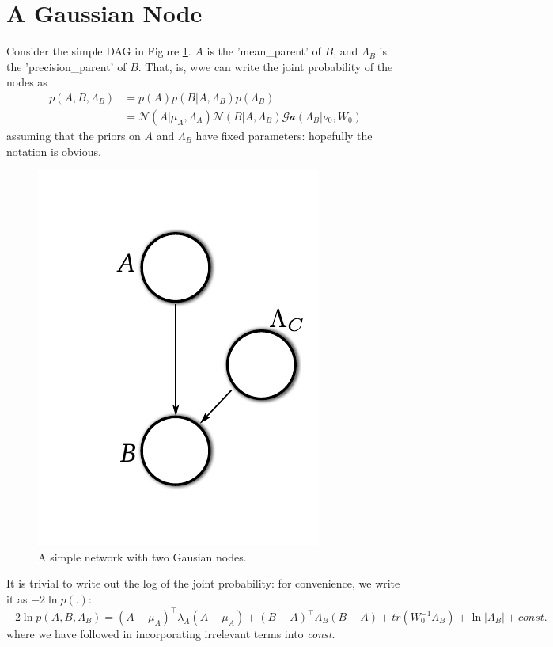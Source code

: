 \documentclass{article}
\newcommand{\const}{\textit{const.}}
\newcommand{\tr}{\textit{tr}}
\newcommand{\<}{\langle}
\renewcommand{\>}{\rangle}
\begin{document}
\section{A Gaussian Node}
Consider the simple DAG in Figure \ref{fig:simple_DAG}.  $A$ is the 'mean\_parent' of $B$, and $\Lambda_B$ is the 'precision\_parent' of $B$. That, is, wwe can write the joint probability of the nodes as
\begin{equation}
\begin{split}
p(A,B,\Lambda_B) &= p(A) p(B | A, \Lambda_B) p(\Lambda_B)\\
&= \mathcal N (A|\mu_A, \Lambda_A) \mathcal N (B | A, \Lambda_B) \mathcal {Ga}(\Lambda_B | \nu_0, W_0)
\end{split}
\end{equation}
assuming that the priors on $A$ and $\Lambda_B$ have fixed parameters: hopefully the notation is obvious.  

\begin{figure}
\centering
\includegraphics{images/simple_DAG}
\caption{A simple network with two Gausian nodes.}
\label{fig:simple_DAG}
\end{figure}

It is trivial to write out the log of the joint probability: for convenience, we write it as $-2 \ln p(.)$:
\begin{equation}
-2 \ln p(A,B,\Lambda_B) = (A-\mu_A)^\top\lambda_A(A-\mu_A) + (B-A)^\top\Lambda_B(B-A) + \tr (W_0^{-1}\Lambda_B) + \ln|\Lambda_B| + \const
\end{equation}
where we have followed \cite{Bishop2006prm} in incorporating irrelevant terms into {\em const}.  
\end{document}

